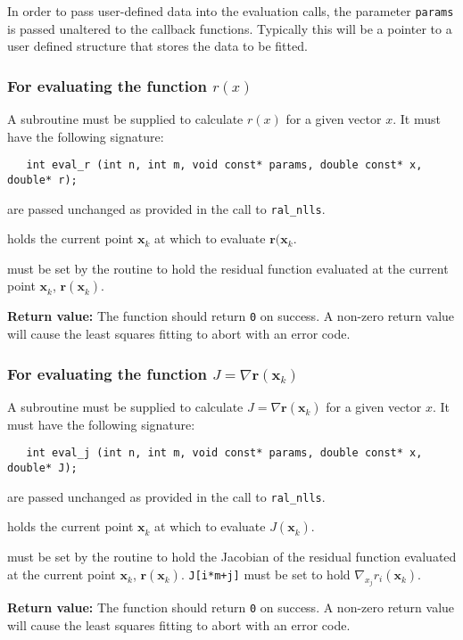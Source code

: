\documentclass{spec}
\newcommand{\vx}{ {\bm x} } %
\newcommand{\vr}{ {\bm r} } %
\newcommand{\iter}[2][k]{ #2_{#1}^{}} %
\begin{document}
In order to pass user-defined data into the evaluation calls, the parameter
\texttt{params} is passed unaltered to the callback functions. Typically this
will be a pointer to a user defined structure that stores the data to be fitted.

\subsubsection{For evaluating the function $r(x)$}
A subroutine must be supplied to calculate $r(x)$ for a given vector $x$. It
must have the following signature:

\begin{verbatim}
   int eval_r (int n, int m, void const* params, double const* x, double* r);
\end{verbatim}

\begin{description}
    are passed unchanged as provided in the call to
      {\tt ral\_nlls}.

    holds the current point $\iter{\vx}$ at which to evaluate $\vr(\iter{\vx}$.
  
    must be set by the routine to hold the residual function 
      evaluated at the current point $\iter{\vx}$, $\vr(\iter{\vx})$.
\end{description}
\textbf{Return value:} The function should return \texttt{0} on success. A
non-zero return value will cause the least squares fitting to abort with an
error code.


\subsubsection{For evaluating the function $J = \nabla \vr(\iter{\vx})$}
A subroutine must be supplied to calculate $J = \nabla \vr(\iter{\vx})$ for a given vector $x$. It must have the following signature:

\begin{verbatim}
   int eval_j (int n, int m, void const* params, double const* x, double* J);
\end{verbatim}

\begin{description}
    are passed unchanged as provided in the call to
      {\tt ral\_nlls}.

    holds the current point $\iter{\vx}$ at which to evaluate
      $J(\iter{\vx})$.
  
    must be set by the routine to hold the Jacobian of the residual
      function evaluated at the current point $\iter{\vx}$, $\vr(\iter{\vx})$.
      \texttt{J[i*m+j]} must be set to hold $\nabla_{x_j} r_i(\iter{\vx})$.
\end{description}
\textbf{Return value:} The function should return \texttt{0} on success. A
non-zero return value will cause the least squares fitting to abort with an
error code.
\end{document}
